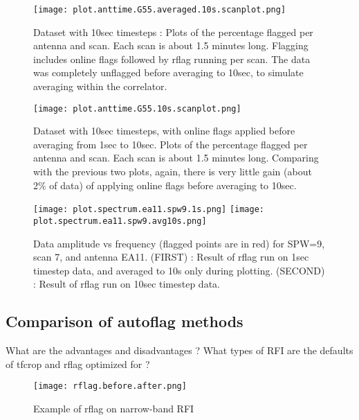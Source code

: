 \begin{figure}
\texttt{[image: plot.anttime.G55.averaged.10s.scanplot.png]}
\caption{Dataset with 10sec timesteps : Plots of the percentage flagged per antenna and scan. Each scan is about 1.5 minutes long. Flagging includes online flags followed by rflag running per scan. The data was completely unflagged before averaging to 10sec, to simulate averaging within the correlator.}
\label{Fig:compare_4}
\end{figure}

\begin{figure}
\texttt{[image: plot.anttime.G55.10s.scanplot.png]}
\caption{Dataset with 10sec timesteps, with online flags applied before averaging from 1sec to 10sec.  Plots of the percentage flagged per antenna and scan. Each scan is about 1.5 minutes long. Comparing with the previous two plots, again, there is very little gain (about 2\% of data) of applying online flags before averaging to 10sec. }
\label{Fig:compare_5}
\end{figure}


\begin{figure}
\texttt{[image: plot.spectrum.ea11.spw9.1s.png]}
\texttt{[image: plot.spectrum.ea11.spw9.avg10s.png]}
\caption{Data amplitude vs frequency (flagged points are in red) for SPW=9, scan 7, and antenna EA11.  (FIRST) : Result of rflag run on 1sec timestep data, and averaged to 10s only during plotting.  (SECOND) : Result of rflag run on 10sec timestep data.}
\label{Fig:compare_6}
\end{figure}



\subsection{Comparison of autoflag methods}
What are the advantages and disadvantages ?  What types of RFI are the defaults of tfcrop and rflag optimized for ?  

\begin{figure}
\texttt{[image: rflag.before.after.png]}
\caption{Example of rflag on narrow-band RFI}
\end{figure}









